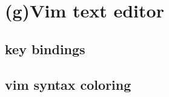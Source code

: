 \chapter{(g)Vim text editor}\label{vim}

\section{key bindings}\label{vimkeys}

\section{vim syntax coloring}\label{vimsyntax}
